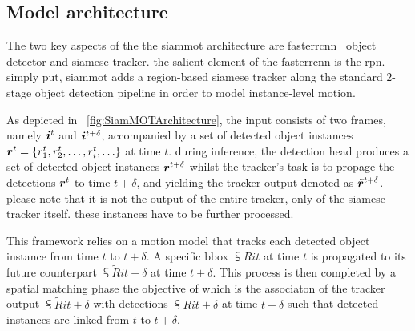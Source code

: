 \subsection{Model architecture}

The two key aspects of the the \gls{siammot} architecture are \gls{fasterrcnn}~\cite{ren2017fasterrcnn} object detector and siamese tracker. the salient element of the \gls{fasterrcnn} is the \gls{rpn}. simply put, \gls{siammot} adds a region-based siamese tracker along the standard $2$-stage object detection pipeline in order to model instance-level motion.

As depicted in \figtext{}~\ref{fig:SiamMOTArchitecture}, the input consists of two frames, namely $\bm{i}^{t}$ and $\bm{i}^{t + \delta}$, accompanied by a set of detected object instances $\bm{r}^{t} = \left\{ {{r}_{1}^{t}, {r}_{2}^{t}, \dots, {r}_{i}^{t}, \dots} \right\}$ at time $t$. during inference, the detection head produces a set of detected object instances $\bm{r}^{t + \delta}$ whilst the tracker's task is to propage the detections $\bm{r}^{t}$ to time $t + \delta$, and yielding the tracker output denoted as $\bm{\tilde{r}}^{t + \delta}$. please note that it is not the output of the entire tracker, only of the siamese tracker itself. these instances have to be further processed.

This framework relies on a motion model that tracks each detected object instance from time $t$ to $t + \delta$. A specific \gls{bbox} $\subsup{R}{i}{t}$ at time $t$ is propagated to its future counterpart $\subsup{\tilde{R}}{i}{t + \delta}$ at time $t + \delta$. This process is then completed by a spatial matching phase the objective of which is the associaton of the tracker output $\subsup{\tilde{R}}{i}{t + \delta}$ with detections $\subsup{R}{i}{t + \delta}$ at time $t + \delta$ such that detected instances are linked from $t$ to $t + \delta$.

